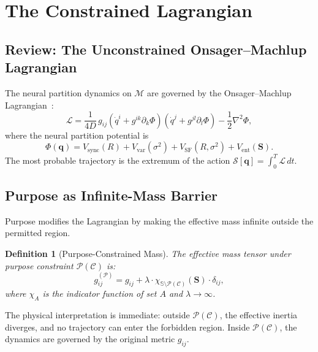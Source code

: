 \documentclass[aps,prd,twocolumn,superscriptaddress,floatfix,nofootinbib]{revtex4-2}
\newtheorem{definition}[theorem]{Definition}
\theoremstyle{remark}
\newcommand{\Svec}{\mathbf{S}}
\newcommand{\qvec}{\mathbf{q}}
\newcommand{\Lag}{\mathcal{L}}
\newcommand{\Action}{\mathcal{S}}
\newcommand{\Pot}{\Phi}
\newcommand{\Purpose}{\mathcal{P}}
\newcommand{\Context}{\mathcal{C}}
\newcommand{\Sspace}{\mathbb{S}}
\begin{document}
\section{The Constrained Lagrangian}
\label{sec:lagrangian}

\subsection{Review: The Unconstrained Onsager--Machlup Lagrangian}

The neural partition dynamics on $\mathcal{M}$ are governed by the Onsager--Machlup Lagrangian~\cite{onsager1953,machlup1953,sachikonye2026lagrangian}:
\begin{equation}
\Lag = \frac{1}{4D}\,g_{ij}\!\left(\dot{q}^i + g^{ik}\partial_k\Pot\right)\!\left(\dot{q}^j + g^{jl}\partial_l\Pot\right) - \frac{1}{2}\nabla^2\Pot,
\label{eq:lagrangian_review}
\end{equation}
where the neural partition potential is
\begin{equation}
\Pot(\qvec) = V_{\mathrm{sync}}(R) + V_{\mathrm{var}}(\sigma^2) + V_{\mathrm{SF}}(R, \sigma^2) + V_{\mathrm{ent}}(\Svec).
\end{equation}
The most probable trajectory is the extremum of the action $\Action[\qvec] = \int_0^T \Lag\,dt$.

\subsection{Purpose as Infinite-Mass Barrier}

Purpose modifies the Lagrangian by making the effective mass infinite outside the permitted region.

\begin{definition}[Purpose-Constrained Mass]
\label{def:purpose_mass}
The effective mass tensor under purpose constraint $\Purpose(\Context)$ is:
\begin{equation}
\boxed{g_{ij}^{(\Purpose)} = g_{ij} + \lambda \cdot \chi_{\Sspace \setminus \Purpose(\Context)}(\Svec) \cdot \delta_{ij},}
\label{eq:effective_mass}
\end{equation}
where $\chi_A$ is the indicator function of set $A$ and $\lambda \to \infty$.
\end{definition}

The physical interpretation is immediate: outside $\Purpose(\Context)$, the effective inertia diverges, and no trajectory can enter the forbidden region.
Inside $\Purpose(\Context)$, the dynamics are governed by the original metric $g_{ij}$.
\end{document}
